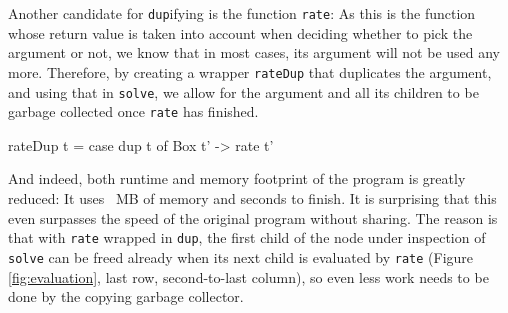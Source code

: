 \documentclass[preprint]{sigplanconf}
\theoremstyle{nonumberplain}
\newcommand{\li}{\lstinline[style=Haskell]}
\begin{document}
Another candidate for \li-dup-ifying is the function \li-rate-:
As this is the function whose return value is taken into account when deciding whether to pick the argument or not, we know that in most cases, its argument will not be used any more. Therefore, by creating a wrapper \li-rateDup- that duplicates the argument, and using that in \li-solve-, we allow for the argument and all its children to be garbage collected once \li-rate- has finished.
\begin{haskell}
rateDup t = case dup t of Box t' -> rate t'
\end{haskell}

And indeed, both runtime and memory footprint of the program is greatly reduced: It uses ~MB of memory and  seconds to finish. It is surprising that this even surpasses the speed of the original program without sharing. The reason is that with \li-rate- wrapped in \li-dup-, the first child of the node under inspection of \li-solve- can be freed already when its next child is evaluated by \li-rate- (Figure \ref{fig:evaluation}, last row, second-to-last column), so even less work needs to be done by the copying garbage collector.
\end{document}

